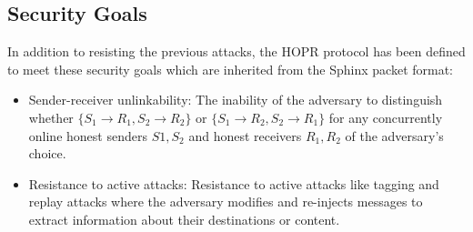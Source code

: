 \subsection*{Security Goals}
In addition to resisting the previous attacks, the HOPR protocol has been defined to meet these security goals which are inherited from the Sphinx packet format:
\begin{itemize}
    \item Sender-receiver unlinkability: The inability of the adversary to distinguish whether $\{S_1\rightarrow R_1, S_2\rightarrow R_2\}$ or $\{S_1\rightarrow R_2, S_2\rightarrow R_1\}$ for any concurrently online honest senders $S1,S_2$ and honest receivers $R_1,R_2$ of the adversary’s choice. 
    \item Resistance to active attacks: Resistance to active attacks like tagging and replay attacks where the adversary modifies and re-injects messages to extract information about their destinations or content.
    
\end{itemize}




